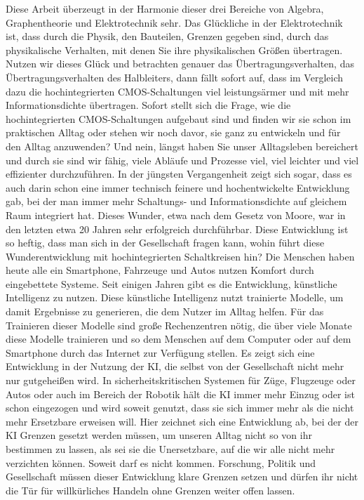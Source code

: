 \documentclass[12pt, a4paper]{article}
\theoremstyle{definition}
\theoremstyle{remark}
\begin{document}
Diese Arbeit überzeugt in der Harmonie dieser drei Bereiche von Algebra, Graphentheorie und Elektrotechnik sehr. Das Glückliche in der Elektrotechnik ist, dass durch die Physik, den Bauteilen, Grenzen gegeben sind, durch das physikalische Verhalten, mit denen Sie ihre physikalischen Größen übertragen. Nutzen wir dieses Glück und betrachten genauer das Übertragungsverhalten, das Übertragungsverhalten des Halbleiters, dann fällt sofort auf, dass im Vergleich dazu die hochintegrierten CMOS-Schaltungen viel leistungsärmer und mit mehr Informationsdichte übertragen. Sofort stellt sich die Frage, wie die hochintegrierten CMOS-Schaltungen aufgebaut sind und finden wir sie schon im praktischen Alltag oder stehen wir noch davor, sie ganz zu entwickeln und für den Alltag anzuwenden? Und nein, längst haben Sie unser Alltagsleben bereichert und durch sie sind wir fähig, viele Abläufe und Prozesse viel, viel leichter und viel effizienter durchzuführen. In der jüngsten Vergangenheit zeigt sich sogar, dass es auch darin schon eine immer technisch feinere und hochentwickelte Entwicklung gab, bei der man immer mehr Schaltungs- und Informationsdichte auf gleichem Raum integriert hat. Dieses Wunder, etwa nach dem Gesetz von Moore, war in den letzten etwa 20 Jahren sehr erfolgreich durchführbar. Diese Entwicklung ist so heftig, dass man sich in der Gesellschaft fragen kann, wohin führt diese Wunderentwicklung mit hochintegrierten Schaltkreisen hin? Die Menschen haben heute alle ein Smartphone, Fahrzeuge und Autos nutzen Komfort durch eingebettete Systeme. Seit einigen Jahren gibt es die Entwicklung, künstliche Intelligenz zu nutzen. Diese künstliche Intelligenz nutzt trainierte Modelle, um damit Ergebnisse zu generieren, die dem Nutzer im Alltag helfen. Für das Trainieren dieser Modelle sind große Rechenzentren nötig, die über viele Monate diese Modelle trainieren und so dem Menschen auf dem Computer oder auf dem Smartphone durch das Internet zur Verfügung stellen. Es zeigt sich eine Entwicklung in der Nutzung der KI, die selbst von der Gesellschaft nicht mehr nur gutgeheißen wird. In sicherheitskritischen Systemen für Züge, Flugzeuge oder Autos oder auch im Bereich der Robotik hält die KI immer mehr Einzug oder ist schon eingezogen und wird soweit genutzt, dass sie sich immer mehr als die nicht mehr Ersetzbare erweisen will. Hier zeichnet sich eine Entwicklung ab, bei der der KI Grenzen gesetzt werden müssen, um unseren Alltag nicht so von ihr bestimmen zu lassen, als sei sie die Unersetzbare, auf die wir alle nicht mehr verzichten können. Soweit darf es nicht kommen. Forschung, Politik und Gesellschaft müssen dieser Entwicklung klare Grenzen setzen und dürfen ihr nicht die Tür für willkürliches Handeln ohne Grenzen weiter offen lassen.
\end{document}
